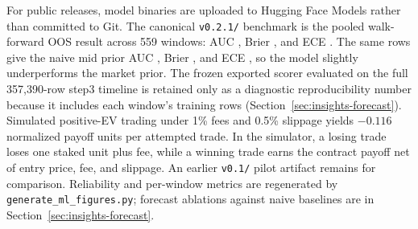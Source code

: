 For public releases, model binaries are uploaded to Hugging Face Models rather
than committed to Git. The canonical \texttt{v0.2.1/} benchmark is the pooled
walk-forward OOS result across 559 windows: AUC \OpenMarketModelOosAuc{},
Brier \OpenMarketModelOosBrier{}, and ECE \OpenMarketModelOosEce{}. The same
rows give the naive mid prior AUC \OpenMarketNaiveOosAuc{}, Brier
\OpenMarketNaiveOosBrier{}, and ECE \OpenMarketNaiveOosEce{}, so the model
slightly underperforms the market prior. The frozen exported scorer evaluated on
the full 357{,}390-row step3 timeline is retained only as a diagnostic
reproducibility number because it includes each window's training rows
(Section~\ref{sec:insights-forecast}).
Simulated positive-EV trading under 1\% fees and 0.5\% slippage yields
$-0.116$ normalized payoff units per attempted trade. In the simulator, a
losing trade loses one staked unit plus fee, while a winning trade earns the
contract payoff net of entry price, fee, and slippage. An earlier
\texttt{v0.1/} pilot artifact remains for comparison.
Reliability and per-window metrics are regenerated by
\texttt{generate\_ml\_figures.py}; forecast ablations against naive baselines
are in Section~\ref{sec:insights-forecast}.
